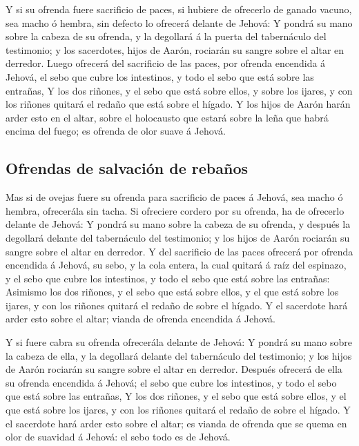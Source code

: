  Y si su ofrenda fuere sacrificio de paces, si hubiere de
ofrecerlo de ganado vacuno, sea macho ó hembra, sin defecto lo ofrecerá
delante de Jehová:  Y pondrá su mano sobre la cabeza de su
ofrenda, y la degollará á la puerta del tabernáculo del testimonio; y
los sacerdotes, hijos de Aarón, rociarán su sangre sobre el altar en
derredor.  Luego ofrecerá del sacrificio de las paces, por
ofrenda encendida á Jehová, el sebo que cubre los intestinos, y todo el
sebo que está sobre las entrañas,  Y los dos riñones, y el
sebo que está sobre ellos, y sobre los ijares, y con los riñones quitará
el redaño que está sobre el hígado.  Y los hijos de Aarón
harán arder esto en el altar, sobre el holocausto que estará sobre la
leña que habrá encima del fuego; es ofrenda de olor suave á Jehová.

\hypertarget{ofrendas-de-salvaciuxf3n-de-rebauxf1os}{%
\subsection{Ofrendas de salvación de
rebaños}\label{ofrendas-de-salvaciuxf3n-de-rebauxf1os}}

 Mas si de ovejas fuere su ofrenda para sacrificio de
paces á Jehová, sea macho ó hembra, ofrecerála sin tacha. 
Si ofreciere cordero por su ofrenda, ha de ofrecerlo delante de Jehová:
 Y pondrá su mano sobre la cabeza de su ofrenda, y después
la degollará delante del tabernáculo del testimonio; y los hijos de
Aarón rociarán su sangre sobre el altar en derredor.  Y
del sacrificio de las paces ofrecerá por ofrenda encendida á Jehová, su
sebo, y la cola entera, la cual quitará á raíz del espinazo, y el sebo
que cubre los intestinos, y todo el sebo que está sobre las entrañas:
 Asimismo los dos riñones, y el sebo que está sobre
ellos, y el que está sobre los ijares, y con los riñones quitará el
redaño de sobre el hígado.  Y el sacerdote hará arder
esto sobre el altar; vianda de ofrenda encendida á Jehová.

 Y si fuere cabra su ofrenda ofrecerála delante de
Jehová:  Y pondrá su mano sobre la cabeza de ella, y la
degollará delante del tabernáculo del testimonio; y los hijos de Aarón
rociarán su sangre sobre el altar en derredor.  Después
ofrecerá de ella su ofrenda encendida á Jehová; el sebo que cubre los
intestinos, y todo el sebo que está sobre las entrañas, 
Y los dos riñones, y el sebo que está sobre ellos, y el que está sobre
los ijares, y con los riñones quitará el redaño de sobre el hígado.
 Y el sacerdote hará arder esto sobre el altar; es vianda
de ofrenda que se quema en olor de suavidad á Jehová: el sebo todo es de
Jehová.

